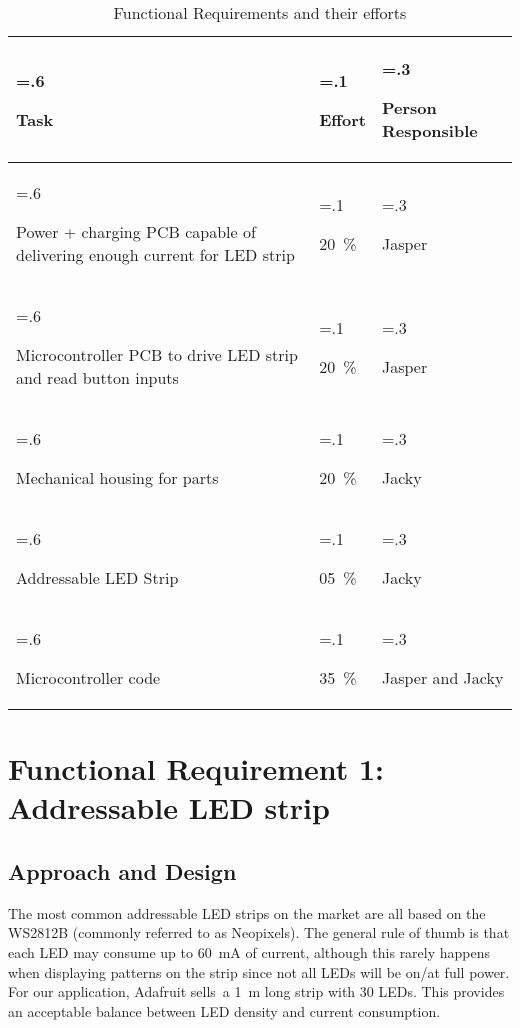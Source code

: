 \documentclass{notes}
\begin{document}
\begin{table}[H]
    \centering
    \begin{tabularx}{\textwidth}
        {
            >{\hsize=.6\hsize\raggedright}X
            >{\hsize=.1\hsize\raggedright}X
            >{\hsize=.3\hsize\raggedright\arraybackslash}X
        }
        Task                                                                    & Effort            & Person Responsible \\\toprule
        Power + charging PCB capable of delivering enough current for LED strip & \SI{20}{\percent} & Jasper             \\\midrule
        Microcontroller PCB to drive LED strip and read button inputs           & \SI{20}{\percent} & Jasper             \\\midrule
        Mechanical housing for parts                                            & \SI{20}{\percent} & Jacky              \\\midrule
        Addressable LED Strip                                                   & \SI{05}{\percent} & Jacky              \\ \midrule
        Microcontroller code                                                    & \SI{35}{\percent} & Jasper and Jacky   \\\bottomrule
    \end{tabularx}
    \caption{Functional Requirements and their efforts}
    \label{tab:funcreq}
\end{table}

\section{Functional Requirement 1: Addressable LED strip}

\subsection{Approach and Design}

The most common addressable LED strips on the market are all based on the WS2812B (commonly referred to as Neopixels).
The general rule of thumb is that each LED may consume up to \SI{60}{\milli\ampere} of current, although this rarely happens when displaying patterns on the strip since not all LEDs will be on/at full power.
For our application, Adafruit sells\footnotemark\ a \SI{1}{\meter} long strip with 30 LEDs.
This provides an acceptable balance between LED density and current consumption.
\end{document}
